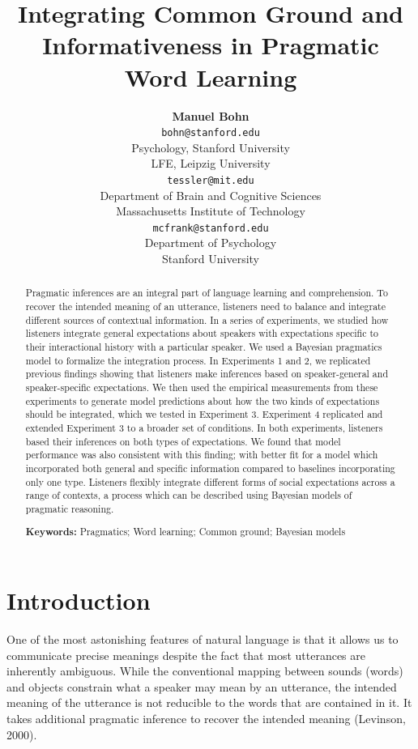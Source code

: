 \documentclass[10pt, letterpaper]{article}
\title{Integrating Common Ground and Informativeness in Pragmatic Word Learning}
\author{{\large \bf Manuel Bohn} \\ \texttt{bohn@stanford.edu} \\ Psychology, Stanford University \\ LFE, Leipzig University 
 \And {\large \bf Michael Henry Tessler} \\ \texttt{tessler@mit.edu} \\ Department of Brain and Cognitive Sciences \\ Massachusetts Institute of Technology
 \And {\large \bf Michael C. Frank} \\ \texttt{mcfrank@stanford.edu} \\ Department of Psychology \\ Stanford University}
\begin{document}
\maketitle

\begin{abstract}
Pragmatic inferences are an integral part of language learning and
comprehension. To recover the intended meaning of an utterance,
listeners need to balance and integrate different sources of contextual
information. In a series of experiments, we studied how listeners
integrate general expectations about speakers with expectations specific
to their interactional history with a particular speaker. We used a
Bayesian pragmatics model to formalize the integration process. In
Experiments 1 and 2, we replicated previous findings showing that
listeners make inferences based on speaker-general and speaker-specific
expectations. We then used the empirical measurements from these
experiments to generate model predictions about how the two kinds of
expectations should be integrated, which we tested in Experiment 3.
Experiment 4 replicated and extended Experiment 3 to a broader set of
conditions. In both experiments, listeners based their inferences on
both types of expectations. We found that model performance was also
consistent with this finding; with better fit for a model which
incorporated both general and specific information compared to baselines
incorporating only one type. Listeners flexibly integrate different
forms of social expectations across a range of contexts, a process which
can be described using Bayesian models of pragmatic reasoning.

\textbf{Keywords:}
Pragmatics; Word learning; Common ground; Bayesian models
\end{abstract}

\section{Introduction}\label{introduction}

One of the most astonishing features of natural language is that it
allows us to communicate precise meanings despite the fact that most
utterances are inherently ambiguous. While the conventional mapping
between sounds (words) and objects constrain what a speaker may mean by
an utterance, the intended meaning of the utterance is not reducible to
the words that are contained in it. It takes additional pragmatic
inference to recover the intended meaning (Levinson, 2000).
\end{document}
